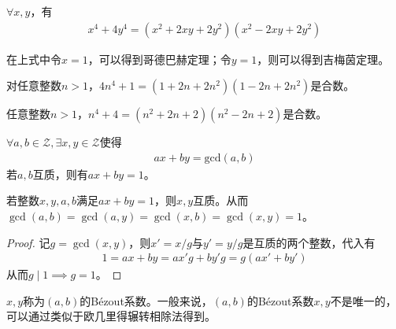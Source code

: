 \begin{theorem}
  $\forall x,y$，有
  \begin{align*}
    x^4 + 4y^4 = (x^2 + 2xy + 2y^2)(x^2 - 2xy + 2y^2)
  \end{align*}
\end{theorem}
在上式中令$x=1$，可以得到哥德巴赫定理；令$y=1$，则可以得到吉梅茵定理。
\begin{theorem}\mbox{}\par
  对任意整数$n>1$，$4n^4+1=(1+2n+2n^2)(1-2n+2n^2)$是合数。  
\end{theorem}
\begin{theorem}\mbox{}\par
  任意整数$n>1$，$n^4+4=(n^2+2n+2)(n^2-2n+2)$是合数。
\end{theorem}


\begin{theorem}\label{th:Bezout}
  $\forall a,b\in\mathcal{Z},\exists x,y\in\mathcal{Z}$使得
  \begin{align*}
    ax+by=\mathrm{gcd}(a,b)
  \end{align*}
  若$a,b$互质，则有$ax+by=1$。
\end{theorem}

\begin{theorem}\label{th:inverse-bezout}
  若整数$x,y,a,b$满足$ax+by=1$，则$x,y$互质。从而$\gcd(a,b)=\gcd(a,y)=\gcd(x,b)=\gcd(x,y)=1$。
\end{theorem}
\begin{proof}
  记$g=\gcd(x,y)$，则$x'=x/g$与$y'=y/g$是互质的两个整数，代入有
  \begin{align*}
    1=ax+by=ax'g+by'g=g(ax'+by')
  \end{align*}
  从而$g\mid 1\implies g=1$。
\end{proof}

$x,y$称为$(a,b)$的B\'ezout系数。一般来说，$(a,b)$的B\'ezout系数$x,y$不是唯一的，可以通过类似于欧几里得辗转相除法得到。

